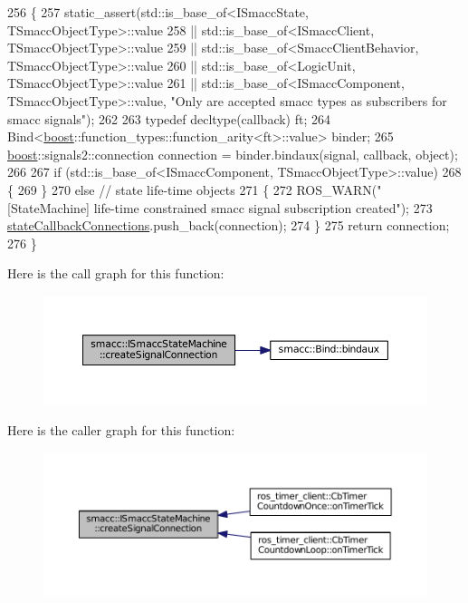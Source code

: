 \begin{DoxyCode}
256 \{
257     static\_assert(std::is\_base\_of<ISmaccState, TSmaccObjectType>::value 
258                 || std::is\_base\_of<ISmaccClient, TSmaccObjectType>::value 
259                 || std::is\_base\_of<SmaccClientBehavior, TSmaccObjectType>::value 
260                 || std::is\_base\_of<LogicUnit, TSmaccObjectType>::value 
261                 || std::is\_base\_of<ISmaccComponent, TSmaccObjectType>::value, \textcolor{stringliteral}{"Only are accepted smacc
       types as subscribers for smacc signals"});
262 
263     \textcolor{keyword}{typedef} decltype(callback) ft;
264     Bind<\hyperlink{namespaceboost}{boost}::function\_types::function\_arity<ft>::value> binder;
265     \hyperlink{namespaceboost}{boost}::signals2::connection connection = binder.bindaux(signal, callback, \textcolor{keywordtype}{object});
266 
267     if (std::is\_base\_of<ISmaccComponent, TSmaccObjectType>::value)
268     \{
269     \}
270     \textcolor{keywordflow}{else} \textcolor{comment}{// state life-time objects}
271     \{
272         ROS\_WARN(\textcolor{stringliteral}{"[StateMachine] life-time constrained smacc signal subscription created"});
273         \hyperlink{classsmacc_1_1ISmaccStateMachine_aaf98bb0edaa5d8c84767e4acfad3548d}{stateCallbackConnections}.push\_back(connection);
274     \}
275     \textcolor{keywordflow}{return} connection;
276 \}
\end{DoxyCode}


Here is the call graph for this function\+:
\nopagebreak
\begin{figure}[H]
\begin{center}
\leavevmode
\includegraphics[width=350pt]{classsmacc_1_1ISmaccStateMachine_adf0f42ade0c65cc471960fe2a7c42da2_cgraph}
\end{center}
\end{figure}




Here is the caller graph for this function\+:
\nopagebreak
\begin{figure}[H]
\begin{center}
\leavevmode
\includegraphics[width=350pt]{classsmacc_1_1ISmaccStateMachine_adf0f42ade0c65cc471960fe2a7c42da2_icgraph}
\end{center}
\end{figure}


